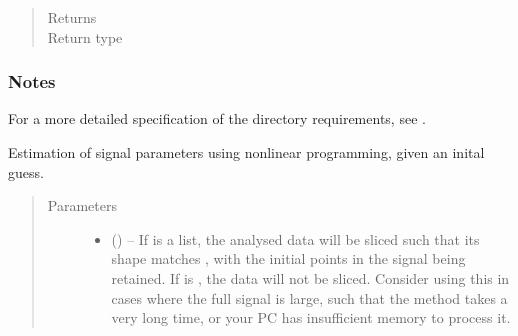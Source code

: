 \documentclass[letterpaper,10pt,english]{sphinxmanual}
\begin{document}
\begin{fulllineitems}
\begin{fulllineitems}
\begin{quote}
\begin{description}
\begin{itemize}
\end{itemize}

\item[{Returns}] \leavevmode
\sphinxAtStartPar
{}

\item[{Return type}] \leavevmode
\sphinxAtStartPar
{\hyperref[\detokenize{references/core:nmrespy.core.Estimator}]{}}

\end{description}\end{quote}
\subsubsection*{Notes}

\sphinxAtStartPar
For a more detailed specification of the directory requirements,
see .

\end{fulllineitems}


\begin{fulllineitems}
\label{\detokenize{references/core:nmrespy.core.Estimator.nonlinear_programming}}
\sphinxAtStartPar
Estimation of signal parameters using nonlinear programming, given
an inital guess.
\begin{quote}\begin{description}
\item[{Parameters}] \leavevmode\begin{itemize}
\item {} 
\sphinxAtStartPar
{} (\sphinxstyleliteralemphasis{\sphinxupquote{, }}\sphinxstyleliteralemphasis{\sphinxupquote{{[}}}\sphinxstyleliteralemphasis{\sphinxupquote{{]}}}\sphinxstyleliteralemphasis{\sphinxupquote{{[}}}\sphinxstyleliteralemphasis{\sphinxupquote{, }}\sphinxstyleliteralemphasis{\sphinxupquote{{]}}}\sphinxstyleliteralemphasis{\sphinxupquote{, }}) – If  is a list, the analysed data will be sliced such that
its shape matches , with the initial points in the signal
being retained. If  is , the data will not be
sliced. Consider using this in cases where the full signal is
large, such that the method takes a very long time, or your PC
has insufficient memory to process it.


\end{itemize}
\end{description}
\end{quote}
\end{fulllineitems}
\end{fulllineitems}
\end{document}
